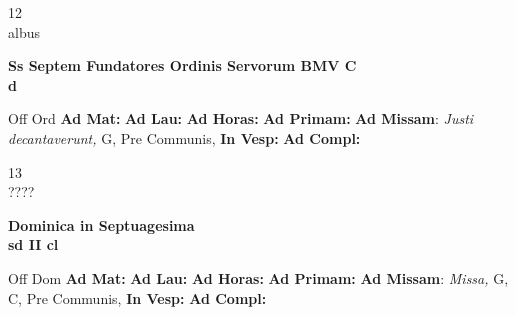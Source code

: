 \documentclass[10pt, openany]{book}
\begin{document}
    \begin{center}
        \begin{minipage}{3.5in}
            \vspace{2em}
            \begin{minipage}{0.5in}
                {\Huge 12} \\
                {\normalsize albus}
            \end{minipage}
            \begin{minipage}{3.0in}
                \textbf{ \large Ss Septem Fundatores Ordinis Servorum BMV C \\
                \textnormal{\normalsize d}}

            \end{minipage}
            \begin{justify}Off Ord
                \textbf{Ad Mat: }
                \textbf{Ad Lau: }
                \textbf{Ad Horas: }
                \textbf{Ad Primam: }\textbf{Ad Missam}: \textit{Justi decantaverunt,} G, Pre Communis, 
                \textbf{In Vesp: }
                \textbf{Ad Compl: }
            \end{justify}
        \end{minipage}
    \end{center}

    \begin{center}
        \begin{minipage}{3.5in}
            \vspace{2em}
            \begin{minipage}{0.5in}
                {\Huge 13} \\
                {\normalsize ????}
            \end{minipage}
            \begin{minipage}{3.0in}
                \textbf{ \large Dominica in Septuagesima \\
                \textnormal{\normalsize sd II cl}}

            \end{minipage}
            \begin{justify}Off Dom
                \textbf{Ad Mat: }
                \textbf{Ad Lau: }
                \textbf{Ad Horas: }
                \textbf{Ad Primam: }\textbf{Ad Missam}: \textit{Missa,} G, C, Pre Communis, 
                \textbf{In Vesp: }
                \textbf{Ad Compl: }
            \end{justify}
        \end{minipage}
    \end{center}
\end{document}

